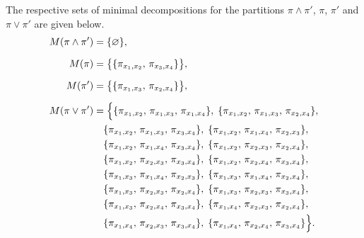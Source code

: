 \documentclass[12pt]{extarticle}
\begin{document}
The respective sets of minimal decompositions for the partitions $\pi\wedge\pi'$, $\pi$, $\pi'$ and $\pi\vee\pi'$ are given below.
\[
\begin{aligned}
M(\pi \wedge \pi') &= \{\varnothing\}, \\[6pt]
M(\pi) &= \bigl\{\{\pi_{x_1,x_2},\,\pi_{x_3,x_4}\}\bigr\}, \\[6pt]
M(\pi') &= \bigl\{\{\pi_{x_1,x_3},\,\pi_{x_2,x_4}\}\bigr\}, \\[6pt]
M(\pi \vee \pi')
&= \Bigl\{ 
\{\pi_{x_1,x_2},\,\pi_{x_1,x_3},\,\pi_{x_1,x_4}\},\;
\{\pi_{x_1,x_2},\,\pi_{x_1,x_3},\,\pi_{x_2,x_4}\},\\
&\quad
\{\pi_{x_1,x_2},\,\pi_{x_1,x_3},\,\pi_{x_3,x_4}\},\;
\{\pi_{x_1,x_2},\,\pi_{x_1,x_4},\,\pi_{x_2,x_3}\},\\
&\quad
\{\pi_{x_1,x_2},\,\pi_{x_1,x_4},\,\pi_{x_3,x_4}\},\;
\{\pi_{x_1,x_2},\,\pi_{x_2,x_3},\,\pi_{x_2,x_4}\},\\
&\quad
\{\pi_{x_1,x_2},\,\pi_{x_2,x_3},\,\pi_{x_3,x_4}\},\;
\{\pi_{x_1,x_2},\,\pi_{x_2,x_4},\,\pi_{x_3,x_4}\},\\
&\quad
\{\pi_{x_1,x_3},\,\pi_{x_1,x_4},\,\pi_{x_2,x_3}\},\;
\{\pi_{x_1,x_3},\,\pi_{x_1,x_4},\,\pi_{x_2,x_4}\},\\
&\quad
\{\pi_{x_1,x_3},\,\pi_{x_2,x_3},\,\pi_{x_2,x_4}\},\;
\{\pi_{x_1,x_3},\,\pi_{x_2,x_3},\,\pi_{x_3,x_4}\},\\
&\quad
\{\pi_{x_1,x_3},\,\pi_{x_2,x_4},\,\pi_{x_3,x_4}\},\;
\{\pi_{x_1,x_4},\,\pi_{x_2,x_3},\,\pi_{x_2,x_4}\},\\
&\quad
\{\pi_{x_1,x_4},\,\pi_{x_2,x_3},\,\pi_{x_3,x_4}\},\;
\{\pi_{x_1,x_4},\,\pi_{x_2,x_4},\,\pi_{x_3,x_4}\}
\Bigr\}.
\end{aligned}
\]
\end{document}

